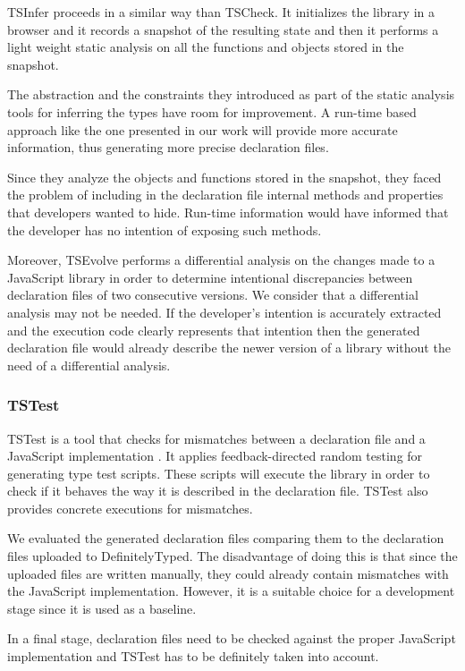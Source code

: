 TSInfer proceeds in a similar way than TSCheck. It initializes the library in a browser and it records a snapshot of the resulting state and then it performs a light weight static analysis on all the functions and objects stored in the snapshot.

The abstraction and the constraints they introduced as part of the static analysis tools for inferring the types have room for improvement. A run-time based approach like the one presented in our work will provide more accurate information, thus generating more precise declaration files.

Since they analyze the objects and functions stored in the snapshot, they faced the problem of including in the declaration file internal methods and properties that developers wanted to hide. Run-time information would have informed that the developer has no intention of exposing such methods.

Moreover, TSEvolve performs a differential analysis on the changes made to a JavaScript library in order to determine intentional discrepancies between declaration files of two consecutive versions. We consider that a differential analysis may not be needed. If the developer's intention is accurately extracted and the execution code clearly represents that intention then the generated declaration file would already describe the newer version of a library without the need of a differential analysis.

\subsubsection{TSTest}
TSTest is a tool that checks for mismatches between a declaration file and a JavaScript implementation \citep{DBLP:journals/pacmpl/KristensenM17}. It applies feedback-directed random testing for generating type test scripts. These scripts will execute the library in order to check if it behaves the way it is described in the declaration file. TSTest also provides concrete executions for mismatches.

We evaluated the generated declaration files comparing them to the declaration files uploaded to DefinitelyTyped. The disadvantage of doing this is that since the uploaded files are written manually, they could already contain mismatches with the JavaScript implementation. However, it is a suitable choice for a development stage since it is used as a baseline.

In a final stage, declaration files need to be checked against the proper JavaScript implementation and TSTest has to be definitely taken into account.